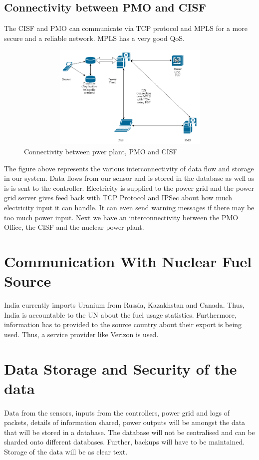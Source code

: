 \documentclass{article}
\begin{document}
\subsection{Connectivity between PMO and CISF}
The CISF and PMO can communicate via TCP protocol and MPLS for a more secure and a reliable network. MPLS has a very good QoS.



\begin{figure}[htb]
	\centering
	\includegraphics[width=12cm,height=5cm]{ass.png}
	\caption{Connectivity between pwer plant, PMO and CISF}
\end{figure}
The figure above represents the various interconnectivity of data flow and storage in our system. Data flows from our sensor and is stored in the database as well as is is sent to the controller.
Electricity is supplied to the power grid and the power grid server gives feed back with TCP Protocol and IPSec about how much electricity input it can handle. It can even send warning messages if there may be too much power input. Next we have an interconnectivity between the PMO Office, the CISF and the nuclear power plant. 
\section{Communication With Nuclear Fuel Source}
 India currently imports Uranium from Russia, Kazakhstan and Canada. Thus, India is accountable to the UN about the fuel usage statistics. Furthermore, information has to provided to the source country about their export is being used. Thus, a service provider like Verizon is used.
\section{Data Storage and Security of the data}
\paragraph{}
Data from the sensors, inputs from the controllers, power grid and logs of packets, details of information shared, power outputs will be amongst the  data that will be stored in a database. 
The database will not be centralised and can be sharded onto different databases. Further, backups will have to be maintained. Storage of the data will be as clear text.
\end{document}
